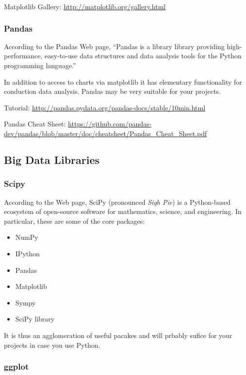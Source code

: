 Matplotlib Gallery: \url{http://matplotlib.org/gallery.html}

\subsubsection{Pandas}\label{pandas}


According to the Pandas Web page, ``Pandas is a library library
providing high-performance, easy-to-use data structures and data
analysis tools for the Python programming language.''

In addition to access to charts via matplotlib it has elementary
functionality for conduction data analysis. Pandas may be very suitable
for your projects.

Tutorial: \url{http://pandas.pydata.org/pandas-docs/stable/10min.html}

Pandas Cheat Sheet:
\url{https://github.com/pandas-dev/pandas/blob/master/doc/cheatsheet/Pandas_Cheat_Sheet.pdf}

\subsection{Big Data Libraries}\label{other-useful-libraries}

\subsubsection{Scipy}\label{s:scipy}


According to the Web page, SciPy (pronounced \textit{Sigh Pie}) is a
Python-based ecosystem of open-source software for mathematics, science,
and engineering. In particular, these are some of the core packages:

\begin{itemize}
\item NumPy
\item IPython
\item Pandas
\item Matplotlib
\item Sympy
\item SciPy library
\end{itemize}

It is thus an agglomeration of useful pacakes and will prbably sufice
for your projects in case you use Python.

\subsubsection{ggplot}\label{ggplot}

